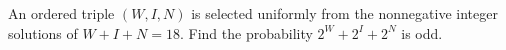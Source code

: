 An ordered triple $(W,I,N)$ is selected uniformly from the nonnegative integer solutions of $ W+I+N=18 $. Find the probability $ 2^W+2^I+2^N $ is odd.
